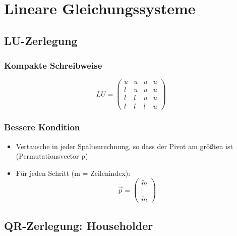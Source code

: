 \section{Lineare Gleichungssysteme}

\subsection{LU-Zerlegung}

\subsubsection*{Kompakte Schreibweise}
\begin{displaymath}
	LU = 
	\begin{pmatrix}
		u & u & u & u \\
		l & u & u & u \\
		l & l & u & u \\
		l & l & l & u
	\end{pmatrix}
\end{displaymath}

\subsubsection*{Bessere Kondition}
\begin{itemize}

	\item Vertausche in jeder Spaltenrechnung, so dass der Pivot am größten ist (Permutationsvector p)
	
	\item Für jeden Schritt (m = Zeilenindex):
		\begin{displaymath}
			\vec{p} =
			\begin{pmatrix}
				\widetilde{m} \\
				\vdots \\
				\widetilde{m}
			\end{pmatrix}
		\end{displaymath}

\end{itemize}

\subsection{QR-Zerlegung: Householder}

